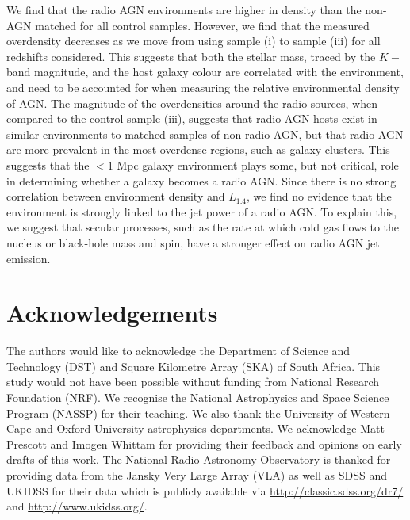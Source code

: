 We find that the radio AGN environments are higher in density than the non-AGN matched for all control samples. However, we find that the measured overdensity decreases as we move from using sample (i) to sample (iii) for all redshifts considered. This suggests that both the stellar mass, traced by the $K-$band magnitude, and the host galaxy colour are correlated with the environment, and need to be accounted for when measuring the relative environmental density of AGN.  The magnitude of the overdensities around the radio sources, when compared to the control sample (iii), suggests that radio AGN hosts exist in similar environments to matched samples of non-radio AGN, but that radio AGN are more prevalent in the most overdense regions, such as galaxy clusters. This suggests that the $<1$ Mpc galaxy environment plays some, but not critical, role in determining whether a galaxy becomes a radio AGN. Since there is no strong correlation between environment density and $L_{1.4}$, we find no evidence that the environment is strongly linked to the jet power of a radio AGN. To explain this, we suggest that secular processes, such as the rate at which cold gas flows to the nucleus or black-hole mass and spin, have a stronger effect on radio AGN jet emission.

\section*{Acknowledgements}
{\footnotesize The authors would like to acknowledge the Department of Science and Technology (DST) and Square Kilometre Array (SKA) of South Africa. This study would not have been possible without funding from National Research Foundation (NRF). We recognise the National Astrophysics and Space Science Program (NASSP) for their teaching. We also thank the University of Western Cape and Oxford University astrophysics departments. We acknowledge Matt Prescott and Imogen Whittam for providing their feedback and opinions on early drafts of this work. The National Radio Astronomy Observatory is thanked for providing data from the Jansky Very Large Array (VLA) as well as SDSS and UKIDSS for their data which is publicly available via \url{http://classic.sdss.org/dr7/} and \url{http://www.ukidss.org/}.} 
